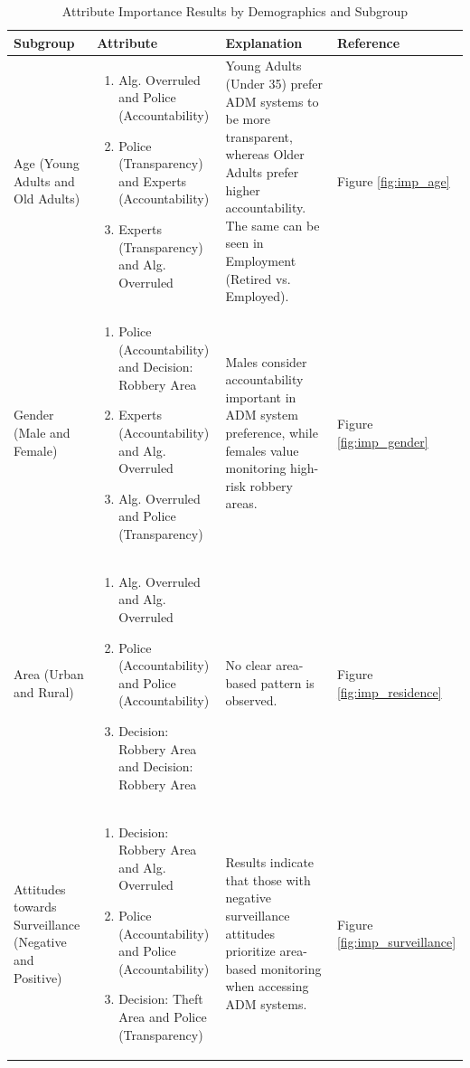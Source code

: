 \begin{table}[H]
\centering
\footnotesize
\begin{tabular}{p{3cm} p{5cm} p{6cm} p{2cm}}
\toprule
\textbf{Subgroup} & \textbf{Attribute} & \textbf{Explanation} & \textbf{Reference} \\
\midrule
Age (Young Adults and Old Adults) & 
\begin{enumerate}
\item Alg. Overruled and Police (Accountability)
\item Police (Transparency) and Experts (Accountability)
\item Experts (Transparency) and Alg. Overruled
\end{enumerate} & 
Young Adults (Under 35) prefer ADM systems to be more transparent, whereas Older Adults prefer higher accountability. The same can be seen in Employment (Retired vs. Employed).   & Figure \ref{fig:imp_age} \\[1em]
\midrule
Gender (Male and Female) & 
\begin{enumerate}
\item Police (Accountability) and Decision: Robbery Area
\item Experts (Accountability) and Alg. Overruled
\item Alg. Overruled and Police (Transparency) 
\end{enumerate} & 
Males consider accountability important in ADM system preference, while females value monitoring high-risk robbery areas.  & Figure \ref{fig:imp_gender} \\[1em]
\midrule
Area (Urban and Rural) & 
\begin{enumerate}
\item Alg. Overruled and Alg. Overruled 
\item Police (Accountability) and Police (Accountability) 
\item Decision: Robbery Area and Decision: Robbery Area 
\end{enumerate} & 
No clear area-based pattern is observed. & Figure \ref{fig:imp_residence} \\[1em]
\midrule
Attitudes towards Surveillance (Negative and Positive) & 
\begin{enumerate}
\item Decision: Robbery Area and Alg. Overruled
\item Police (Accountability) and Police (Accountability)
\item Decision: Theft Area and Police (Transparency)
\end{enumerate} & 
Results indicate that those with negative surveillance attitudes prioritize area-based monitoring when accessing ADM systems.  & Figure \ref{fig:imp_surveillance} \\[1em]
\bottomrule
\end{tabular}
\caption{ Attribute Importance Results by Demographics and Subgroup}
\label{tab:subgroup2}
\end{table}
